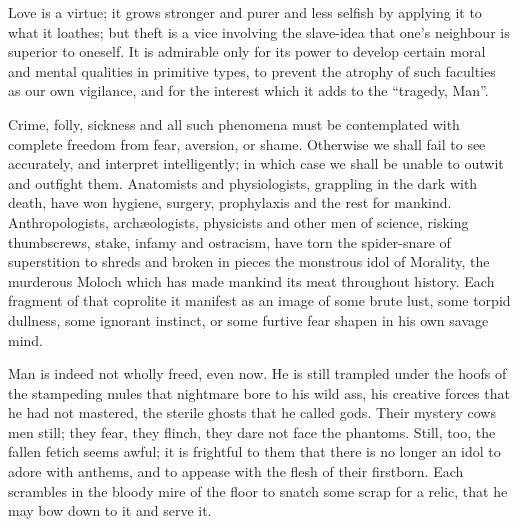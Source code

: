 Love is a virtue; it grows stronger and purer and less selfish by applying it to what it loathes; but theft is a vice involving the slave-idea that one's neighbour is superior to oneself. It is admirable only for its power to develop certain moral and mental qualities in primitive types, to prevent the atrophy of such faculties as our own vigilance, and for the interest which it adds to the \enquote{tragedy, Man}.

Crime, folly, sickness and all such phenomena must be contemplated with complete freedom from fear, aversion, or shame. Otherwise we shall fail to see accurately, and interpret intelligently; in which case we shall be unable to outwit and outfight them. Anatomists and physiologists, grappling in the dark with death, have won hygiene, surgery, prophylaxis and the rest for mankind. Anthropologists, arch\ae{}ologists, physicists and other men of science, risking thumbscrews, stake, infamy and ostracism, have torn the spider-snare of superstition to shreds and broken in pieces the monstrous idol of Morality, the murderous Moloch which has made mankind its meat throughout history. Each fragment of that coprolite it manifest as an image of some brute lust, some torpid dullness, some ignorant instinct, or some furtive fear shapen in his own savage mind.

Man is indeed not wholly freed, even now. He is still trampled under the hoofs of the stampeding mules that nightmare bore to his wild ass, his creative forces that he had not mastered, the sterile ghosts that he called gods. Their mystery cows men still; they fear, they flinch, they dare not face the phantoms. Still, too, the fallen fetich seems awful; it is frightful to them that there is no longer an idol to adore with anthems, and to appease with the flesh of their firstborn. Each scrambles in the bloody mire of the floor to snatch some scrap for a relic, that he may bow down to it and serve it.

